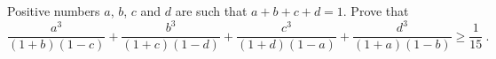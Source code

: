 \problem{}
Positive numbers $a$, $b$, $c$ and $d$ are such that $a + b + c + d = 1$.
Prove that
\[
   \frac{a^3}{(1 + b) (1 - c)}
   +
   \frac{b^3}{(1 + c) (1 - d)}
   +
   \frac{c^3}{(1 + d) (1 - a)}
   +
   \frac{d^3}{(1 + a) (1 - b)}
\geq
   \frac{1}{15}\:.
\]
\solution
\endproblem
